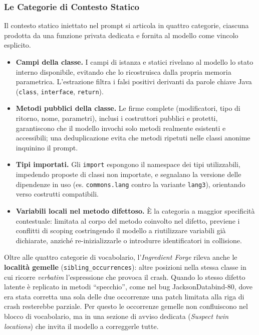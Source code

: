 \subsubsection{Le Categorie di Contesto Statico}
\label{subsubsec:3_3_2_3}
Il contesto statico iniettato nel prompt si articola in quattro categorie, ciascuna prodotta da una funzione
privata dedicata e fornita al modello come vincolo esplicito.
\begin{itemize}
\item \textbf{Campi della classe.} I campi di istanza e statici rivelano al modello lo stato interno disponibile,
evitando che lo ricostruisca dalla propria memoria parametrica. L'estrazione filtra i falsi positivi derivanti da
parole chiave Java (\texttt{class}, \texttt{interface}, \texttt{return}).
\item \textbf{Metodi pubblici della classe.} Le firme complete (modificatori, tipo di ritorno, nome, parametri),
inclusi i costruttori pubblici e protetti, garantiscono che il modello invochi solo metodi realmente esistenti e
accessibili; una deduplicazione evita che metodi ripetuti nelle classi anonime inquinino il prompt.
\item \textbf{Tipi importati.} Gli \texttt{import} espongono il namespace dei tipi utilizzabili, impedendo
proposte di classi non importate, e segnalano la versione delle dipendenze in uso (es. \texttt{commons.lang}
contro la variante \texttt{lang3}), orientando verso costrutti compatibili.
\item \textbf{Variabili locali nel metodo difettoso.} È la categoria a maggior specificità contestuale:
limitata al corpo del metodo coinvolto nel difetto, previene i conflitti di scoping costringendo il modello a
riutilizzare variabili già dichiarate, anziché re-inizializzarle o introdurre identificatori in collisione.
\end{itemize}

Oltre alle quattro categorie di vocabolario, l'\textit{Ingredient Forge} rileva anche le \textbf{località gemelle}
(\texttt{sibling\_occurrences}): altre posizioni nella stessa classe in cui ricorre \emph{verbatim} l'espressione
che provoca il crash. Quando lo stesso difetto latente è replicato in metodi ``specchio'', come nel bug
JacksonDatabind-80, dove era stata corretta una sola delle due occorrenze una patch limitata alla riga di
crash resterebbe parziale. Per questo le occorrenze gemelle non confluiscono nel blocco di vocabolario, ma in una
sezione di avviso dedicata (\emph{Suspect twin locations}) che invita il modello a correggerle tutte.

